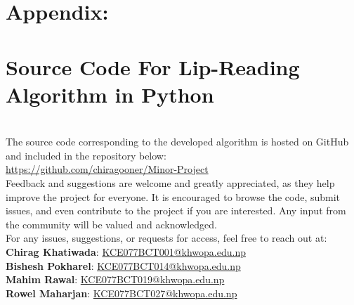 

\titleformat{\section}[block]{\filcenter\bfseries}{\thesection}{1em}{}
\titleformat{\subsection}[block]{\filcenter\bfseries}{\thesubsection}{1em}{}




\section*{\centering\Huge Appendix: }

\section*{Source Code For Lip-Reading Algorithm in Python}\\

The source code corresponding to the developed algorithm is hosted on GitHub and included in the repository below:\\

\url{https://github.com/chiragooner/Minor-Project}\\

Feedback and suggestions are welcome and greatly appreciated, as they help improve the project for everyone. It is encouraged to browse the code, submit issues, and even contribute to the project if you are interested. Any input from the community will be valued and acknowledged.\\

For any issues, suggestions, or requests for access, feel free to reach out at:\\

\textbf{Chirag Khatiwada}: \href{mailto:KCE077BCT001@khwopa.edu.np}{KCE077BCT001@khwopa.edu.np}\\

\textbf{Bishesh Pokharel}: \href{mailto:KCE077BCT014@khwopa.edu.np}{KCE077BCT014@khwopa.edu.np}\\

\textbf{Mahim Rawal}: \href{mailto:KCE077BCT019@khwopa.edu.np}{KCE077BCT019@khwopa.edu.np}\\

\textbf{Rowel Maharjan}: \href{mailto:KCE077BCT027@khwopa.edu.np}{KCE077BCT027@khwopa.edu.np}\\



